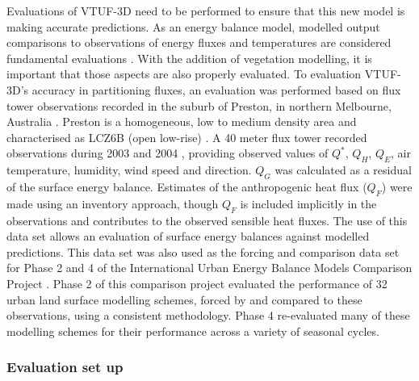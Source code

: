 \documentclass[final,3p,times,authoryear]{elsarticle}
\begin{document}
Evaluations of VTUF-3D need to be performed to ensure that this new model is making accurate predictions. As an energy balance model, modelled output comparisons to observations of energy fluxes and temperatures are considered fundamental evaluations \citep{Masson2002a}. With the addition of vegetation modelling, it is important that those aspects are also properly evaluated. To evaluation VTUF-3D's accuracy in partitioning fluxes, an evaluation was performed based on flux tower observations recorded in the suburb of Preston, in northern Melbourne, Australia \citep{Coutts2007}. Preston is a homogeneous, low to medium density area and characterised as LCZ6B (open low-rise) \citep{Stewart2012b}. A 40 meter flux tower recorded observations during 2003 and 2004 \citep{Coutts2007}, providing observed values of $Q^{*}$, $Q_{H}$, $Q_{E}$, air temperature, humidity, wind speed and direction. $Q_{G}$ was calculated as a residual of the surface energy balance. Estimates of the anthropogenic heat flux ($Q_{F}$) were made using an inventory approach, though $Q_{F}$ is included implicitly in the observations and contributes to the observed sensible heat fluxes. The use of this data set allows an evaluation of surface energy balances against modelled predictions. This data set was also used as the forcing and comparison data set for Phase 2 and 4 of the International Urban Energy Balance Models Comparison Project \citep{Grimmond2011,Best2012}. Phase 2 of this comparison project evaluated the performance of 32 urban land surface modelling schemes, forced by and compared to these observations, using a consistent methodology. Phase 4 re-evaluated many of these modelling schemes for their performance across a variety of seasonal cycles.

\subsubsection{Evaluation set up}\label{sec:modelsetup}
\end{document}
